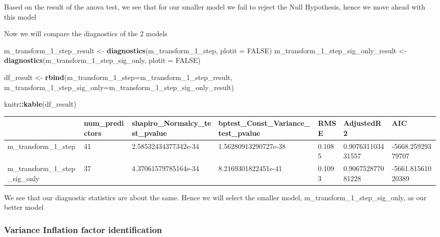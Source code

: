 \documentclass[
]{article}
\newenvironment{Shaded}{\begin{snugshade}}{\end{snugshade}}
\newcommand{\DataTypeTok}[1]{\textcolor[rgb]{0.13,0.29,0.53}{#1}}
\newcommand{\DecValTok}[1]{\textcolor[rgb]{0.00,0.00,0.81}{#1}}
\newcommand{\KeywordTok}[1]{\textcolor[rgb]{0.13,0.29,0.53}{\textbf{#1}}}
\newcommand{\NormalTok}[1]{#1}
\newcommand{\OperatorTok}[1]{\textcolor[rgb]{0.81,0.36,0.00}{\textbf{#1}}}
\newcommand{\OtherTok}[1]{\textcolor[rgb]{0.56,0.35,0.01}{#1}}
\newcommand{\StringTok}[1]{\textcolor[rgb]{0.31,0.60,0.02}{#1}}
\begin{document}
Based on the result of the anova test, we see that for our smaller model we fail to reject the Null Hypothesis, hence we move ahead with this model

Now we will compare the diagnostics of the 2 models

\begin{Shaded}
\begin{Highlighting}[]
\NormalTok{m_transform_}\DecValTok{1}\NormalTok{_step_result <-}\StringTok{ }\KeywordTok{diagnostics}\NormalTok{(m_transform_}\DecValTok{1}\NormalTok{_step, }\DataTypeTok{plotit =} \OtherTok{FALSE}\NormalTok{)}
\NormalTok{m_transform_}\DecValTok{1}\NormalTok{_step_sig_only_result <-}\StringTok{ }\KeywordTok{diagnostics}\NormalTok{(m_transform_}\DecValTok{1}\NormalTok{_step_sig_only, }\DataTypeTok{plotit =} \OtherTok{FALSE}\NormalTok{)}

\NormalTok{df_result <-}\StringTok{ }\KeywordTok{rbind}\NormalTok{(}\DataTypeTok{m_transform_1_step=}\NormalTok{m_transform_}\DecValTok{1}\NormalTok{_step_result, }\DataTypeTok{m_transform_1_step_sig_only=}\NormalTok{m_transform_}\DecValTok{1}\NormalTok{_step_sig_only_result)}

\NormalTok{knitr}\OperatorTok{::}\KeywordTok{kable}\NormalTok{(df_result)}
\end{Highlighting}
\end{Shaded}

\begin{tabular}{l|l|l|l|l|l|l}
\hline
  & num\_predictors & shapiro\_Normalcy\_test\_pvalue & bptest\_Const\_Variance\_test\_pvalue & RMSE & AdjustedR2 & AIC\\
\hline
m\_transform\_1\_step & 41 & 2.58532434377342e-34 & 1.56280913290727e-38 & 0.1085 & 0.907631103431557 & -5668.25929379707\\
\hline
m\_transform\_1\_step\_sig\_only & 37 & 4.37061579785164e-34 & 8.2169301822451e-41 & 0.1093 & 0.906752877081228 & -5661.81561020389\\
\hline
\end{tabular}

We see that our diagnostic statistics are about the same. Hence we will select the smaller model, m\_transform\_1\_step\_sig\_only, as our better model

\hypertarget{variance-inflation-factor-identification}{%
\subsubsection{Variance Inflation factor identification}\label{variance-inflation-factor-identification}}
\end{document}
